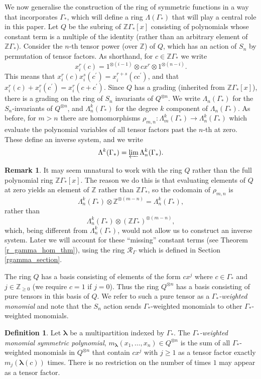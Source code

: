 \documentclass[10pt]{article}
\theoremstyle{definition}
\newtheorem{definition}[theorem]{Definition}
\newtheorem{remark}[theorem]{Remark}
\newcommand{\bs}{\boldsymbol}
\newcommand{\RGamma}{\mathcal{R}_{\Gamma}}
\newcommand{\LambdaG}{\Lambda(\Gamma_*)}
\begin{document}
We now generalise the construction of the ring of symmetric functions in a way that incorporates $\Gamma_*$, which will define a ring $\LambdaG$ that will play a central role in this paper. Let $Q$ be the subring of $\mathbb{Z}\Gamma_*[x]$ consisting of polynomials whose constant term is a multiple of the identity (rather than an arbitrary element of $\mathbb{Z}\Gamma_*$). Consider the $n$-th tensor power (over $\mathbb{Z}$) of $Q$, which has an action of $S_n$ by permutation of tensor factors. As shorthand, for $c \in \mathbb{Z}\Gamma_*$ we write 
\[
x_i^r(c) = 1^{\otimes (i-1)} \otimes cx^r \otimes 1^{\otimes (n-i)}.
\]
This means that $x_i^r(c) x_i^s(c^\prime) = x_i^{r+s}(cc^\prime)$, and that $x_i^r(c) + x_i^r(c^\prime) = x_i^r(c+c^\prime)$. Since $Q$ has a grading (inherited from $\mathbb{Z}\Gamma_*[x]$), there is a grading on the ring of $S_n$ invariants of $Q^{\otimes n}$. We write $\Lambda_n(\Gamma_*)$ for the $S_n$-invariants of $Q^{\otimes n}$, and $\Lambda_n^k(\Gamma_*)$ for the degree $k$ component of $\Lambda_n(\Gamma_*)$. As before, for $m>n$ there are homomorphisms $\rho_{m,n}: \Lambda_{m}^k(\Gamma_*) \to \Lambda_{n}^k(\Gamma_*)$ which evaluate the polynomial variables of all tensor factors past the $n$-th at zero. These define an inverse system, and we write
\[
\Lambda^k(\Gamma_*) = \varprojlim \Lambda_n^k(\Gamma_*).
\]
\begin{remark}
It may seem unnatural to work with the ring $Q$ rather than the full polynomial ring $\mathbb{Z}\Gamma_*[x]$. The reason we do this is that evaluating elements of $Q$ at zero yields an element of $\mathbb{Z}$ rather than $\mathbb{Z}\Gamma_*$, so the codomain of $\rho_{m,n}$ is
\[
\Lambda_n^k(\Gamma_*) \otimes \mathbb{Z}^{\otimes (m-n)} = \Lambda_n^k(\Gamma_*),
\]
rather than
\[
\Lambda_n^k(\Gamma_*) \otimes (\mathbb{Z}\Gamma_*)^{\otimes (m-n)},
\]
which, being different from $\Lambda_n^k(\Gamma_*)$, would not allow us to construct an inverse system. Later we will account for these ``missing'' constant terms (see Theorem \ref{r_gamma_hom_thm}), using the ring $\RGamma$ which is defined in Section \ref{rgamma_section}.
\end{remark}

The ring $Q$ has a basis consisting of elements of the form $c x^j$ where $c \in \Gamma_*$ and $j \in \mathbb{Z}_{\geq 0}$ (we require $c = 1$ if $j=0$). Thus the ring $Q^{\otimes n}$ has a basis consisting of pure tensors in this basis of $Q$. We refer to such a pure tensor as a \emph{$\Gamma_*$-weighted monomial} and note that the $S_n$ action sends $\Gamma_*$-weighted monomials to other $\Gamma_*$-weighted monomials.
\begin{definition}
Let $\bs \lambda$ be a multipartition indexed by $\Gamma_*$. The \emph{$\Gamma_*$-weighted monomial symmetric polynomial}, $m_{\bs \lambda}(x_1, \ldots, x_n) \in Q^{\otimes n}$ is the sum of all $\Gamma_*$-weighted monomials in $Q^{\otimes n}$ that contain $c x^j$ with $j \geq 1$ as a tensor factor exactly $m_j(\bs \lambda(c))$ times. There is no restriction on the number of times $1$ may appear as a tensor factor.
\end{definition}
\end{document}
